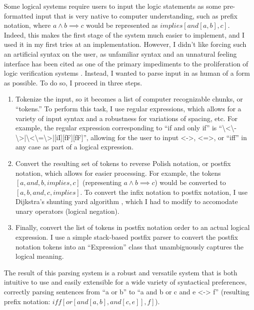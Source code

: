 \documentclass[english]{article}
\begin{document}
Some logical systems require users to input the logic statements as
some pre-formatted input that is very native to computer understanding,
such as prefix notation, where $a\land b\implies c$ would be represented
as $implies\left[and\left[a,b\right],c\right]$. Indeed, this makes
the first stage of the system much easier to implement, and I used
it in my first tries at an implementation. However, I didn't like
forcing such an artificial syntax on the user, as unfamiliar syntax
and an unnatural feeling interface has been cited as one of the primary
impediments to the proliferation of logic verification systems \cite{Hoare:impractical}.
Instead, I wanted to parse input in as human of a form as possible.
To do so, I proceed in three steps.
\begin{enumerate}
\item Tokenize the input, so it becomes a list of computer recognizable
chunks, or {}``tokens.'' To perform this task, I use regular expressions,
which allows for a variety of input syntax and a robustness for variations
of spacing, etc. For example, the regular expression corresponding
to {}``if and only if'' is {}``\textbackslash{}<\textbackslash{}-\textbackslash{}>|\textbackslash{}<\textbackslash{}=\textbackslash{}>|{[}iI{]}{[}fF{]}{[}fF{]}'',
allowing for the user to input <->, <=>, or {}``iff'' in any case
as part of a logical expression.
\item Convert the resulting set of tokens to reverse Polish notation, or
postfix notation, which allows for easier processing. For example,
the tokens $\left[a,and,b,implies,c\right]$ (representing $a\land b\implies c$)
would be converted to $\left[a,b,and,c,implies\right]$. To convert
the infix notation to postfix notation, I use Dijkstra's shunting
yard algorithm \cite{wiki:ShuntingYard}, which I had to modify to
accomodate unary operators (logical negation). 
\item Finally, convert the list of tokens in postfix notation order to an
actual logical expression. I use a simple stack-based postfix parser
to convert the postfix notation tokens into an {}``Expression''
class that unambiguously captures the logical meaning. 
\end{enumerate}
The result of this parsing system is a robust and versatile system
that is both intuitive to use and easily extensible for a wide variety
of syntactical preferences, correctly parsing sentences from {}``a
or b'' to {}``a and b or c and e <-> f'' (resulting prefix notation:
$iff\left[or\left[and\left[a,b\right],and\left[c,e\right]\right],f\right]$).
\end{document}
